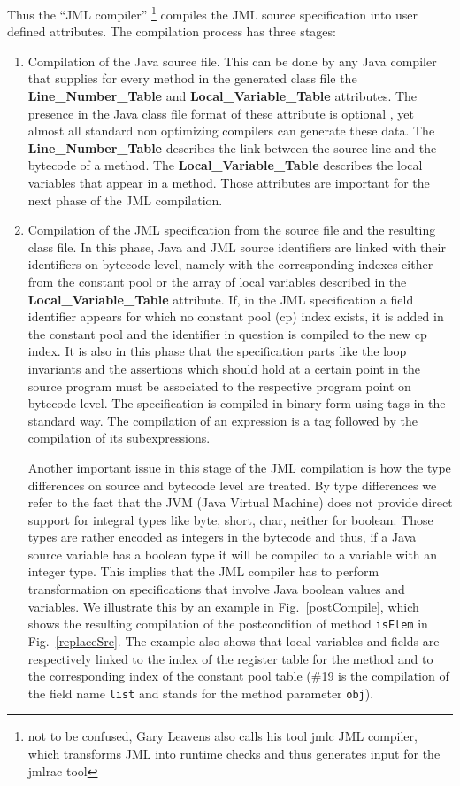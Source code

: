 Thus the ``JML compiler'' \footnote{not to be confused, Gary Leavens also calls his tool jmlc JML compiler, which transforms JML into runtime checks and thus generates input for the jmlrac tool  } compiles the JML source specification into user defined attributes. The compilation process has three stages:
\begin{enumerate}
\item Compilation of the Java source file. This can be done by any Java compiler that supplies for every method in the generated class file 
the \textbf{Line\_Number\_Table} and \textbf{Local\_Variable\_Table}  attributes. The presence in the Java class file format of 
these attribute is optional \cite{VMSpec}, yet almost all standard non optimizing compilers can generate these data. 
The \textbf{Line\_Number\_Table} describes the link between the source line and the bytecode of a method.  
The \textbf{Local\_Variable\_Table} describes the local variables that appear in a method. 
Those attributes are important for the next phase of the JML compilation.
\item Compilation of the JML specification from the source file and the resulting class file. In this phase, Java and JML source identifiers are 
linked with their identifiers on bytecode level, namely with the corresponding indexes either from the constant pool or the array of 
local variables described in the \textbf{Local\_Variable\_Table} attribute. If, in the JML specification a field
identifier appears for which no constant pool (cp) index exists, it is added in the constant pool and the identifier in question
is compiled to the new cp index. It is also in this phase that the specification parts like the loop invariants and the assertions which should hold at a certain point in the source program must be associated to the respective program point on bytecode level. The specification
is compiled in binary form using tags in the standard way. The compilation of an expression is a tag followed by the compilation of its subexpressions. 

Another important issue in this stage of the JML compilation is how the type differences on source and bytecode level are treated. 
By type differences we refer to the fact that the JVM (Java Virtual Machine) does not provide direct support for integral types like byte, short, char, neither for boolean. Those types are rather encoded as integers in the bytecode and thus, if a Java source variable has a boolean type it will be compiled to a variable with
an integer type.
 This implies that the JML compiler has to perform transformation on specifications that involve Java boolean values and variables.  
We illustrate this by an example in Fig.~\ref{postCompile}, which shows the resulting compilation of the postcondition of method \texttt{isElem} in Fig.~\ref{replaceSrc}. The example also shows that local variables and  fields are respectively linked to the index of the register table for the method and to the corresponding index of the constant pool table  (\#19 is the compilation of the field name \texttt{list} and  stands for the method parameter \texttt{obj}). 


\end{enumerate}
